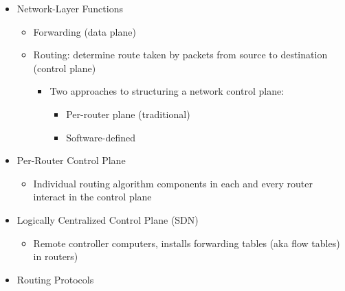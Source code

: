 \begin{itemize}

  \item Network-Layer Functions

    \begin{itemize}

      \item Forwarding (data plane)

      \item Routing: determine route taken by packets from source to destination (control plane)

        \begin{itemize}

          \item Two approaches to structuring a network control plane:

            \begin{itemize}

              \item Per-router plane (traditional)

              \item Software-defined

            \end{itemize}

        \end{itemize}

    \end{itemize}

  \item Per-Router Control Plane

    \begin{itemize}

      \item Individual routing algorithm components in each and every router interact in the control plane

    \end{itemize}

  \item Logically Centralized Control Plane (SDN)

    \begin{itemize}

      \item Remote controller computers, installs forwarding tables (aka flow tables) in routers)

    \end{itemize}

  \item Routing Protocols


\end{itemize}
